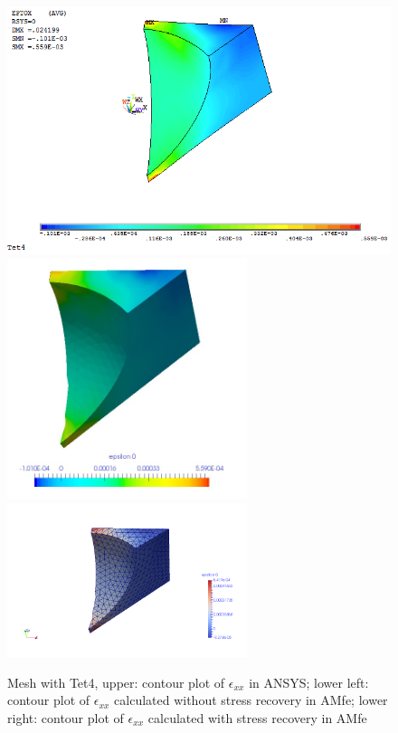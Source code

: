 \begin{figure}[htbp]
	\begin{center}
		\includegraphics[width=13cm,clip]{Tet4Exx.png} 	
		\includegraphics[width=7cm,clip]{Tet4ExxPD.png} 			
		\includegraphics[width=7cm,clip]{Tet4ExxP.png} 		
		\caption{Mesh with Tet4, upper: contour plot of $\epsilon_{xx}$ in ANSYS; lower left: contour plot of $\epsilon_{xx}$ calculated without stress recovery in AMfe; lower right: contour plot of $\epsilon_{xx}$ calculated with stress recovery in AMfe} \label{fig: Tet4_Exx}
	\end{center}
\end{figure}
\clearpage 

